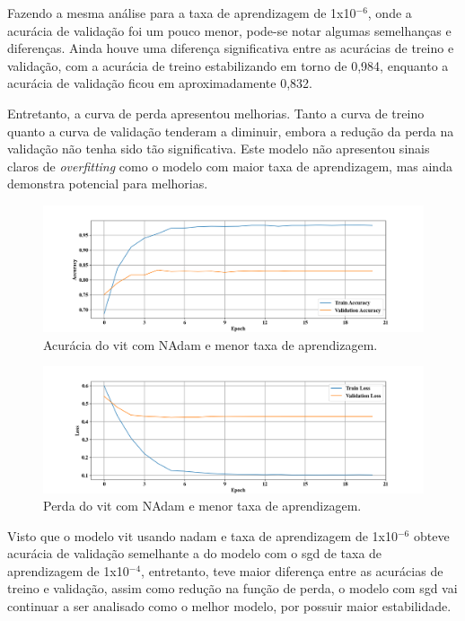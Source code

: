 Fazendo a mesma análise para a taxa de aprendizagem de 1x10$^{-6}$, onde a acurácia de validação foi um pouco menor, pode-se notar algumas semelhanças e diferenças.
Ainda houve uma diferença significativa entre as acurácias de treino e validação, com a acurácia de treino estabilizando em torno de 0,984, enquanto a acurácia de validação ficou em aproximadamente 0,832.

Entretanto, a curva de perda apresentou melhorias.
Tanto a curva de treino quanto a curva de validação tenderam a diminuir, embora a redução da perda na validação não tenha sido tão significativa.
Este modelo não apresentou sinais claros de \textit{overfitting} como o modelo com maior taxa de aprendizagem, mas ainda demonstra potencial para melhorias.

\begin{figure}[tb]
     \centerline{\includegraphics[width=1\linewidth]{images/resultados/nadam_accuracy_1e06.png}}
     \caption{Acurácia do \acrshort{vit} com NAdam e menor taxa de aprendizagem.}
     \label{fig:nadam_acc_1x1006}
\end{figure}
     
\begin{figure}[tb]
     \centerline{\includegraphics[width=1\linewidth]{images/resultados/nadam_loss_1e06.png}}
     \caption{Perda do \acrshort{vit} com NAdam e menor taxa de aprendizagem.}
     \label{fig:nadam_loss_1x1006}
\end{figure}

Visto que o modelo \acrshort{vit} usando \acrshort{nadam} e taxa de aprendizagem de 1x10$^{-6}$ obteve acurácia de validação semelhante a do modelo com o \acrshort{sgd} de taxa de aprendizagem de 1x10$^{-4}$,
entretanto, teve maior diferença entre as acurácias de treino e validação, assim como redução na função de perda, o modelo com \acrshort{sgd} vai continuar a ser analisado como o melhor modelo, por possuir maior estabilidade.

